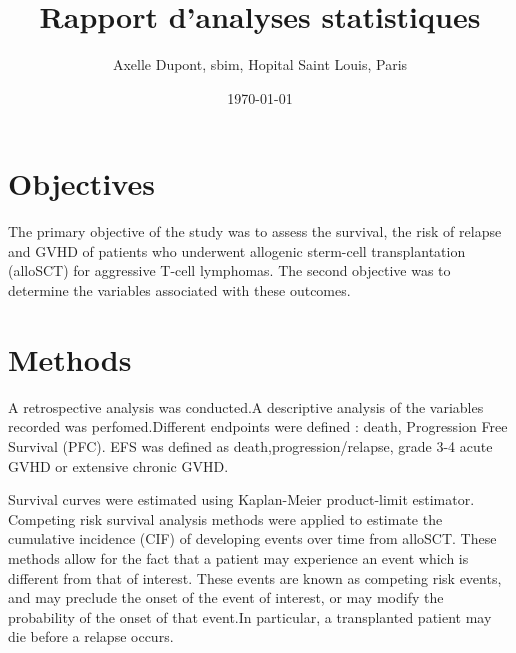 \documentclass[a4paper,11pt] {article}
\begin{document}
\title{Rapport  d'analyses statistiques}
\author{Axelle Dupont, sbim, Hopital Saint Louis, Paris}
\date\today















\maketitle

\tableofcontents
\pagebreak[4]
\listoftables
\listoffigures


\pagebreak[4]

\section{Objectives}

The primary objective of the study was to assess the survival, the risk of relapse and GVHD  of patients who underwent allogenic sterm-cell transplantation (alloSCT) for aggressive T-cell lymphomas. 
The second objective was to determine the variables associated with these outcomes.

\section{Methods}

A  retrospective analysis was conducted.A descriptive analysis of the variables recorded was perfomed.Different endpoints were defined : death, Progression Free Survival (PFC). EFS was defined as death,progression/relapse,  grade 3-4 acute GVHD or extensive chronic GVHD.

Survival curves were estimated using Kaplan-Meier product-limit estimator.
Competing risk survival analysis methods were applied to estimate the cumulative incidence (CIF) of developing events over time from alloSCT. These methods allow for the fact that a patient may experience an event which is different from that of interest. These events are known as competing risk events, and may preclude the onset of the event of interest, or may modify the probability of the onset of that event.In particular, a transplanted patient may die before a relapse occurs. 
\end{document}
